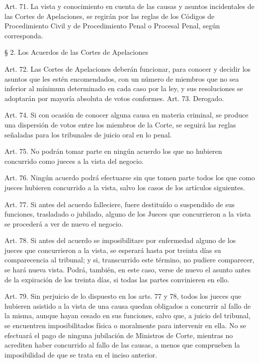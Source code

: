     Art. 71. La vista y conocimiento en cuenta de las causas y asuntos incidentales de las Cortes de Apelaciones, se regirán por las reglas de los Códigos de Procedimiento Civil y de Procedimiento Penal o Procesal Penal, según corresponda.




    § 2. Los Acuerdos de las Cortes de Apelaciones


    Art. 72. Las Cortes de Apelaciones deberán funcionar, para conocer y decidir los asuntos que les estén encomendados, con un número de miembros que no sea inferior al mínimum determinado en cada caso por la ley, y sus resoluciones se adoptarán por mayoría absoluta de votos conformes.
    Art. 73. Derogado.



    Art. 74. Si con ocasión de conocer alguna causa en materia criminal, se produce una dispersión de votos entre los miembros de la Corte, se seguirá las reglas señaladas para los tribunales de juicio oral en lo penal.


    Art. 75. No podrán tomar parte en ningún acuerdo los que no hubieren concurrido como jueces a la vista del negocio.

    Art. 76. Ningún acuerdo podrá efectuarse sin que tomen parte todos los que como jueces hubieren concurrido a la vista, salvo los casos de los artículos siguientes.


    Art. 77. Si antes del acuerdo falleciere, fuere destituído o suspendido de sus funciones, trasladado o jubilado, alguno de los Jueces que concurrieron a la vista se procederá a ver de nuevo el negocio.


    Art. 78. Si antes del acuerdo se imposibilitare por enfermedad alguno de los jueces que concurrieron a la vista, se esperará hasta por treinta días su comparecencia al tribunal; y si, transcurrido este término, no pudiere comparecer, se hará nueva vista.
    Podrá, también, en este caso, verse de nuevo el asunto antes de la expiración de los treinta días, si todas las partes convinieren en ello.

    Art. 79. Sin perjuicio de lo dispuesto en los arts. 77 y 78, todos los jueces que hubieren asistido a la vista de una causa quedan obligados a concurrir al fallo de la misma, aunque hayan cesado en sus funciones, salvo que, a juicio del tribunal, se encuentren imposibilitados física o moralmente para intervenir en ella.
    No se efectuará el pago de ninguna jubilación de Ministros de Corte, mientras no acrediten haber concurrido al fallo de las causas, a menos que comprueben la imposibilidad de que se trata en el inciso anterior.

